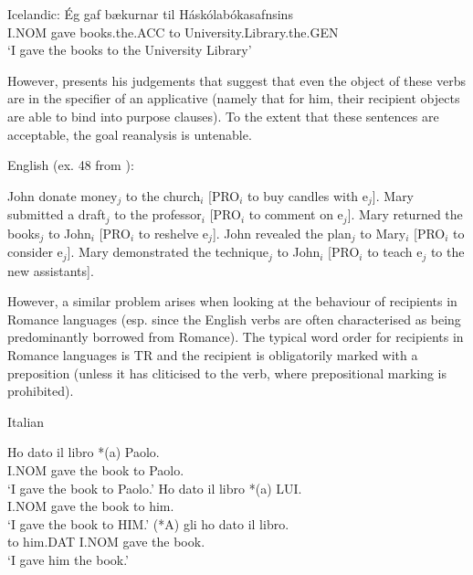 \begin{exe}
	 Icelandic:
	\gll \'{E}g gaf b\ae kurnar til H\'ask\'olab\'okasafnsins\\
	I.NOM gave books.the.ACC to University.Library.the.GEN\\
	\trans `I gave the books to the University Library'
\end{exe}

However, \cite{Hallman.2015} presents his judgements that suggest that even the object of these verbs are in the specifier of an applicative (namely that for him, their recipient objects are able to bind into purpose clauses). To the extent that these sentences are acceptable, the goal reanalysis is untenable.

\begin{exe}
	\ex English (ex. 48 from \citealt{Hallman.2015}):\label{ex:en-purpose-donate}
	\begin{xlist}
		\ex John donate money$_{j}$ to the church$_{i}$ [PRO$_{i}$ to buy candles with e$_{j}$].
		\ex Mary submitted a draft$_{j}$ to the professor$_{i}$ [PRO$_{i}$ to comment on e$_{j}$].
		\ex Mary returned the books$_{j}$ to John$_{i}$ [PRO$_{i}$ to reshelve e$_{j}$].
		\ex John revealed the plan$_{j}$ to Mary$_{i}$ [PRO$_{i}$ to consider e$_{j}$].
		\ex Mary demonstrated the technique$_{j}$ to John$_{i}$ [PRO$_{i}$ to teach e$_{j}$ to the new assistants].
	\end{xlist}
\end{exe}

However, a similar problem arises when looking at the behaviour of recipients in Romance languages (esp. since the English verbs are often characterised as being predominantly borrowed from Romance). The typical word order for recipients in Romance languages is TR and the recipient is obligatorily marked with a preposition (unless it has cliticised to the verb, where prepositional marking is prohibited).

\begin{exe}
\ex Italian \citep[sec. 4.3.1]{Proudfoot.2013}
\begin{xlist}
\ex \gll Ho dato il libro *(a) Paolo.\\
I.NOM gave the book to Paolo.\\
\trans `I gave the book to Paolo.'
\ex \gll Ho dato il libro *(a) LUI.\\
I.NOM gave the book to him.\\
\trans `I gave the book to HIM.'
\ex \gll (*A) gli ho dato il libro.\\
to him.DAT I.NOM gave the book.\\
\trans `I gave him the book.'
\end{xlist}
\end{exe}%

